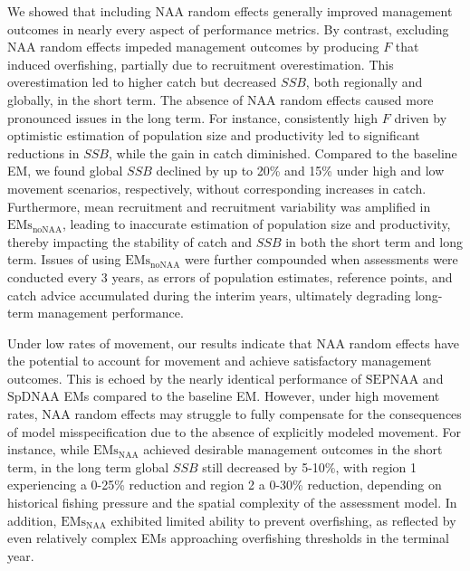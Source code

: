 \documentclass[
  12pt,
]{article}
\begin{document}
We showed that including NAA random effects generally improved
management outcomes in nearly every aspect of performance metrics. By
contrast, excluding NAA random effects impeded management outcomes by
producing \(F\) that induced overfishing, partially due to recruitment
overestimation. This overestimation led to higher catch but decreased
\(SSB\), both regionally and globally, in the short term. The absence of
NAA random effects caused more pronounced issues in the long term. For
instance, consistently high \(F\) driven by optimistic estimation of
population size and productivity led to significant reductions in
\(SSB\), while the gain in catch diminished. Compared to the baseline
EM, we found global \(SSB\) declined by up to 20\% and 15\% under high
and low movement scenarios, respectively, without corresponding
increases in catch. Furthermore, mean recruitment and recruitment
variability was amplified in
\(\text{EMs}_{\scriptscriptstyle \text{noNAA}}\), leading to inaccurate
estimation of population size and productivity, thereby impacting the
stability of catch and \(SSB\) in both the short term and long term.
Issues of using \(\text{EMs}_{\scriptscriptstyle \text{noNAA}}\) were
further compounded when assessments were conducted every 3 years, as
errors of population estimates, reference points, and catch advice
accumulated during the interim years, ultimately degrading long-term
management performance.

Under low rates of movement, our results indicate that NAA random
effects have the potential to account for movement and achieve
satisfactory management outcomes. This is echoed by the nearly identical
performance of \(\text{SEP}{\scriptscriptstyle \text{NAA}}\) and
\(\text{SpD}{\scriptscriptstyle \text{NAA}}\) EMs compared to the
baseline EM. However, under high movement rates, NAA random effects may
struggle to fully compensate for the consequences of model
misspecification due to the absence of explicitly modeled movement. For
instance, while \(\text{EMs}_{\scriptscriptstyle \text{NAA}}\) achieved
desirable management outcomes in the short term, in the long term global
\(SSB\) still decreased by 5-10\%, with region 1 experiencing a 0-25\%
reduction and region 2 a 0-30\% reduction, depending on historical
fishing pressure and the spatial complexity of the assessment model. In
addition, \(\text{EMs}_{\scriptscriptstyle \text{NAA}}\) exhibited
limited ability to prevent overfishing, as reflected by even relatively
complex EMs approaching overfishing thresholds in the terminal year.
\end{document}
